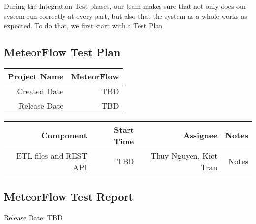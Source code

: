 During the Integration Test phases, our team makes sure that not only does our system run correctly at every part,
but also that the system as a whole works as expected. To do that, we first start with a Test Plan

\subsection{MeteorFlow Test Plan}

\begin{center}
    \begin{tabular}[H]{|r|r|}
        \hline
        Project Name & MeteorFlow \\
        \hline
        Created Date & TBD        \\
        \hline
        Release Date & TBD        \\
        \hline
    \end{tabular}
\end{center}


\begin{tabular}[H]{|r|r|r|r|}
    \hline
    Component              & Start Time & Assignee               & Notes \\
    \hline
    ETL files and REST API & TBD        & Thuy Nguyen, Kiet Tran & Notes \\
    \hline
\end{tabular}


\subsection{MeteorFlow Test Report}

Release Date: TBD
